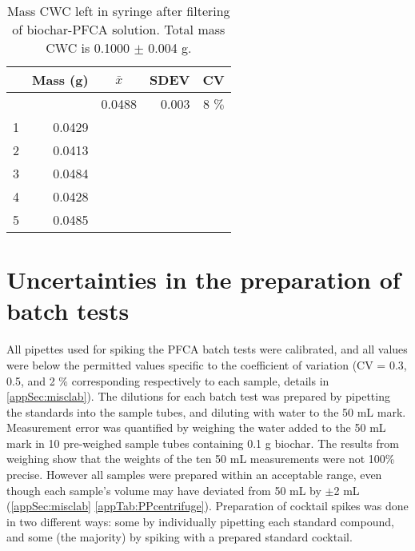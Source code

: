 \begin{table}[th]
\centering
\caption{Mass CWC left in syringe after filtering of biochar-PFCA solution. Total mass CWC is 0.1000 $\pm$ 0.004 g.}
\label{appTab:CWCloss}
\begin{tabular}{rrrrr} \toprule
 & Mass (g) & \multicolumn{1}{c}{$\bar{x}$} & \multicolumn{1}{c}{SDEV} & \multicolumn{1}{c}{CV}  \\ \midrule
 & & 0.0488 & 0.003 & 8 $\%$ \\
1 & 0.0429 \\
2 & 0.0413 \\
3 & 0.0484 \\
4 & 0.0428 \\
5 & 0.0485 \\ \bottomrule
\end{tabular}
\end{table}

\pagebreak
\section{Uncertainties in the preparation of batch tests}
All pipettes used for spiking the PFCA batch tests were calibrated, and all values were below the permitted values specific to the coefficient of variation (CV = 0.3, 0.5, and 2 $\%$ corresponding respectively to each sample, details in \cref{appSec:misclab}). The dilutions for each batch test was prepared by pipetting the standards into the sample tubes, and diluting with water to the 50 mL mark. Measurement error was quantified by weighing the water added to the 50 mL mark in 10 pre-weighed sample tubes containing 0.1 g biochar. The results from weighing show that the weights of the ten 50 mL measurements were not 100\%  precise. However all samples were prepared within an acceptable range, even though each sample's volume may have deviated from 50 mL by $\pm$2 mL (\cref{appSec:misclab} \cref{appTab:PPcentrifuge}). Preparation of cocktail spikes was done in two different ways: some by individually pipetting each standard compound, and some (the majority) by spiking with a prepared standard cocktail.

